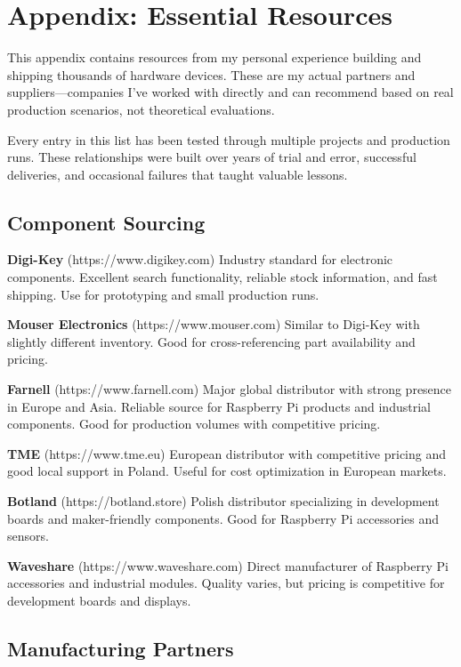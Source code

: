 \chapter*{Appendix: Essential Resources}

This appendix contains resources from my personal experience building and shipping thousands of hardware devices. These are my actual partners and suppliers—companies I've worked with directly and can recommend based on real production scenarios, not theoretical evaluations.

Every entry in this list has been tested through multiple projects and production runs. These relationships were built over years of trial and error, successful deliveries, and occasional failures that taught valuable lessons.

\section{Component Sourcing}

\textbf{Digi-Key} (https://www.digikey.com)
Industry standard for electronic components. Excellent search functionality, reliable stock information, and fast shipping. Use for prototyping and small production runs.

\textbf{Mouser Electronics} (https://www.mouser.com)
Similar to Digi-Key with slightly different inventory. Good for cross-referencing part availability and pricing.

\textbf{Farnell} (https://www.farnell.com)
Major global distributor with strong presence in Europe and Asia. Reliable source for Raspberry Pi products and industrial components. Good for production volumes with competitive pricing.

\textbf{TME} (https://www.tme.eu)
European distributor with competitive pricing and good local support in Poland. Useful for cost optimization in European markets.

\textbf{Botland} (https://botland.store)
Polish distributor specializing in development boards and maker-friendly components. Good for Raspberry Pi accessories and sensors.

\textbf{Waveshare} (https://www.waveshare.com)
Direct manufacturer of Raspberry Pi accessories and industrial modules. Quality varies, but pricing is competitive for development boards and displays.

\section{Manufacturing Partners}

